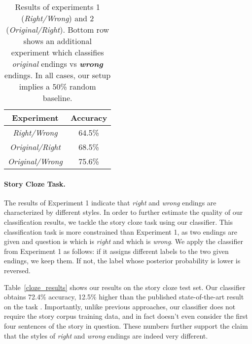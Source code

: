 \documentclass[11pt,a4paper]{article}
\newcommand{\tabref}[1]{Table~\ref{#1}}
\newcommand{\resolved}[1]{}
\newcommand{\nascomment}[1]{{\color{blue}\textsc{[#1 --nas]}}}
\begin{document}
\begin{table}[!t]
\begin{center}
\begin{tabular}{|c|c|} \hline
{\bf Experiment} & {\bf Accuracy} \\ \hline
{\it Right/Wrong} & 64.5\% \\ \hline
{\it Original/Right} & 68.5\% \\ \hline
{\it Original/Wrong} & 75.6\% \\ \hline
\end{tabular}
\end{center}
\caption{\label{results} Results of  experiments 1 ({\it Right/Wrong}) and 2 ({\it Original/Right}). 
Bottom row shows an additional experiment which classifies {\it  original} endings vs \textit{\textbf{wrong}} endings.
In all cases, our setup implies a 50\% random baseline.}
\end{table}

\paragraph{Story Cloze Task.}
The results of Experiment 1 indicate that {\it right} and {\it wrong} endings are characterized by different styles.
In order to further estimate the quality of our classification results, we tackle the story cloze task using our classifier.
This classification task is more constrained than Experiment 1, as two
endings are given and question is which is \emph{right} and which is
\emph{wrong}.
We apply the classifier from Experiment 1 as follows:
if it assigns different labels to the two given endings, we keep
them.  If not, the label whose posterior probability is lower is reversed.

\tabref{cloze_results} shows our results on the story cloze test
set. Our classifier obtains 72.4\% accuracy, 12.5\% higher than the
published state-of-the-art result on the task \cite{Salle:2016} \resolved{\nascomment{cite that here}}.
Importantly, unlike previous approaches, our classifier does not require the story corpus training data, and in fact doesn't even consider the first four sentences of the story in question.
These numbers further support the claim that the styles of {\it right} and {\it wrong} endings are indeed very different.

 \resolved{\nascomment{I suppressed the sentences about the LSDSem shared task;
  once, in the earlier footnote, is enough.}}
\end{document}
